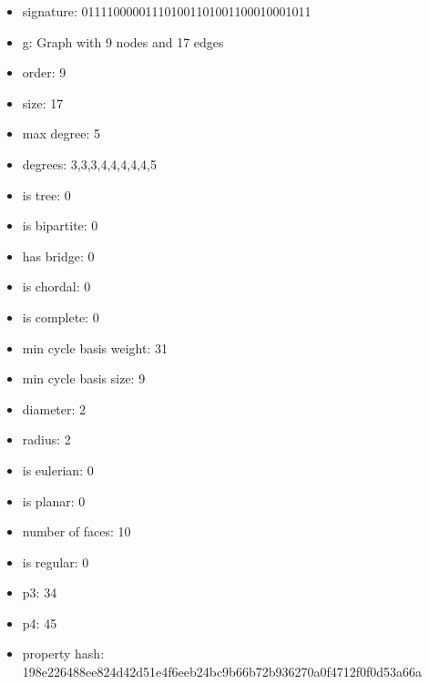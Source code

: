 \newpage
\begin{figure}
\end{figure}
\begin{itemize}
\item signature: 011110000011101001101001100010001011
\item g: Graph with 9 nodes and 17 edges
\item order: 9
\item size: 17
\item max degree: 5
\item degrees: 3,3,3,4,4,4,4,4,5
\item is tree: 0
\item is bipartite: 0
\item has bridge: 0
\item is chordal: 0
\item is complete: 0
\item min cycle basis weight: 31
\item min cycle basis size: 9
\item diameter: 2
\item radius: 2
\item is eulerian: 0
\item is planar: 0
\item number of faces: 10
\item is regular: 0
\item p3: 34
\item p4: 45
\item property hash: 198e226488ee824d42d51e4f6eeb24bc9b66b72b936270a0f4712f0f0d53a66a
\end{itemize}
